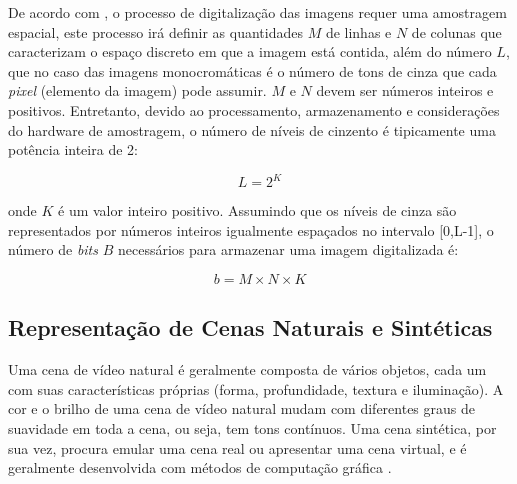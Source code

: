 	De acordo com , o processo de digitalização das imagens requer uma amostragem espacial, este processo irá definir as quantidades $M$ de linhas e $N$ de colunas que caracterizam o espaço discreto em que a imagem está contida, além do número $L$, que no caso das imagens monocromáticas é o número de tons de cinza que cada \textit{pixel} (elemento da imagem) pode assumir. $M$ e $N$ devem ser números inteiros e positivos. Entretanto, devido ao processamento, armazenamento e considerações do hardware de amostragem, o número de níveis de cinzento é tipicamente uma potência inteira de 2:
\vspace{-1cm}
\begin{center}
	\begin{equation}
		L = 2^K
	\end{equation}
\end{center}	 
\noindent onde $K$ é um valor inteiro positivo. Assumindo que os níveis de cinza são representados por números inteiros igualmente espaçados no intervalo [0,L-1], o número de \textit{bits} $B$ necessários para armazenar uma imagem digitalizada é:

\begin{equation}
	b = M \times N \times K
\end{equation}

\subsection{Representação de Cenas Naturais e Sintéticas}

Uma cena de vídeo natural é geralmente composta de vários objetos, cada um com suas características próprias (forma, profundidade, textura e iluminação). A cor e o brilho de uma cena de vídeo natural mudam com diferentes graus de suavidade em toda a cena, ou seja, tem tons contínuos. Uma cena sintética, por sua vez, procura emular uma cena real ou apresentar uma cena virtual, e é geralmente desenvolvida com métodos de computação gráfica \cite{scharstein2002taxonomy}.

